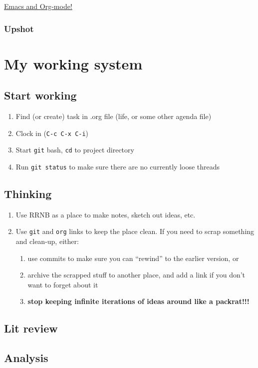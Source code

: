 \documentclass[11pt]{article}
\begin{document}
\href{http://orgmode.org/}{Emacs and Org-mode!}
\subsubsection{Upshot}
\label{sec-3-3-4}
\section{My working system}
\label{sec-4}
\subsection{Start working}
\label{sec-4-1}

\begin{enumerate}
\item Find (or create) task in .org file (life, or some other agenda file)
\item Clock in (\texttt{C-c C-x C-i})
\item Start \texttt{git} bash, \texttt{cd} to project directory
\item Run \texttt{git status} to make sure there are no currently loose threads
\end{enumerate}
\subsection{Thinking}
\label{sec-4-2}

\begin{enumerate}
\item Use RRNB as a place to make notes, sketch out ideas, etc.
\item Use \texttt{git} and \texttt{org} links to keep the place clean. If you need to scrap something and clean-up, either:
\begin{enumerate}
\item use commits to make sure you can ``rewind'' to the earlier version, or
\item archive the scrapped stuff to another place, and add a link if you don't want to forget about it
\item \textbf{stop keeping infinite iterations of ideas around like a packrat!!!}
\end{enumerate}
\end{enumerate}
\subsection{Lit review}
\label{sec-4-3}
\subsection{Analysis}
\label{sec-4-4}
\end{document}
